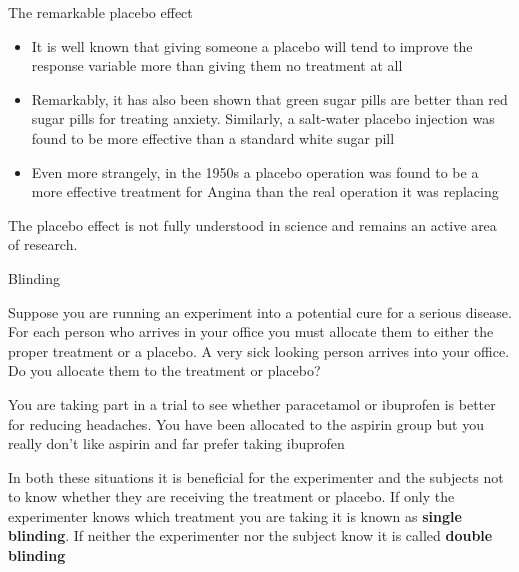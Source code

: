 \documentclass[12pt,xcolor=dvipsnames,handout,mathserif,aspectratio=169]{beamer}
\newcommand{\bbl}[1]{{\color{NavyBlue} \textbf{#1}}}
\newcommand{\bgr}[1]{{\color{PineGreen} \textbf{#1}}}
\begin{document}
\begin{frame}{The remarkable placebo effect }

\begin{itemize}
\item It is well known that giving someone a placebo will tend to improve the response variable more than giving them no treatment at all
\pause
\item Remarkably, it has also been shown that green sugar pills are better than red sugar pills for treating anxiety. Similarly, a salt-water placebo injection was found to be more effective than a standard white sugar pill
\pause
\item Even more strangely, in the 1950s a placebo operation was found to be a more effective treatment for Angina than the real operation it was replacing
\end{itemize}
\pause
The placebo effect is not fully understood in science and remains an active area of research. %
\end{frame}

\begin{frame}{Blinding }

\begin{block}{}
Suppose you are running an experiment into a potential cure for a serious disease. For each person who arrives in your office you must allocate them to either the proper treatment or a placebo. A very sick looking person arrives into your office. Do you allocate them to the treatment or placebo?
\end{block}
\pause
\begin{block}{}
You are taking part in a trial to see whether paracetamol or ibuprofen is better for reducing headaches. You have been allocated to the aspirin group but you really don't like aspirin and far prefer taking ibuprofen
\end{block}
\pause
In both these situations it is beneficial for the experimenter and the subjects not to know whether they are receiving the treatment or placebo. If only the experimenter knows which treatment you are taking it is known as \bbl{single blinding}. If neither the experimenter nor the subject know it is called \bgr{double blinding}

\end{frame}
\end{document}
